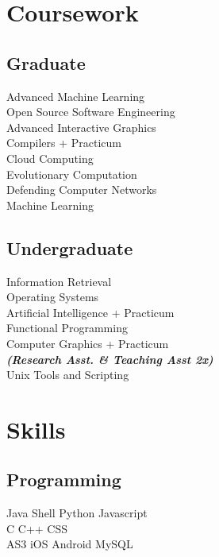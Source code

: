 \documentclass[]{azhagu-swe-resume-openfont}
\begin{document}
\begin{minipage}[t]{0.33\textwidth}

\section{Coursework}
\subsection{Graduate}
Advanced Machine Learning \\
Open Source Software Engineering \\
Advanced Interactive Graphics \\
Compilers + Practicum \\
Cloud Computing \\
Evolutionary Computation \\
Defending Computer Networks \\
Machine Learning \\
\sectionsep

\subsection{Undergraduate}
Information Retrieval \\
Operating Systems \\
Artificial Intelligence + Practicum \\
Functional Programming \\
Computer Graphics + Practicum \\
{\footnotesize \textit{\textbf{(Research Asst. \& Teaching Asst 2x) }}} \\
Unix Tools and Scripting \\


\section{Skills}
\subsection{Programming}
Java \textbullet{}   Shell \textbullet{} Python \textbullet{} Javascript \\
C \textbullet{} C++ \textbullet{} CSS \textbullet{} 
 \\
AS3 \textbullet{} iOS \textbullet{} Android \textbullet{} MySQL
\sectionsep


\end{minipage} 
\end{document}
